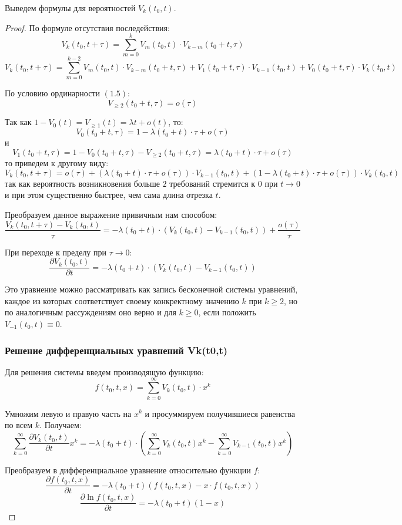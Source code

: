 \documentclass[aps,%
12pt,%
final,%
oneside,
onecolumn,%
musixtex, %
superscriptaddress,%
centertags]{article} %
\theoremstyle{plain}
\theoremstyle{definition}
\theoremstyle{remark}
\begin{document}
Выведем формулы для вероятностей $V_k(t_0,t)$.
\begin{proof}
По формуле отсутствия последействия:
$$V_k(t_0,t+\tau) = \sum_{m=0}^{k} V_m(t_0,t) \cdot V_{k-m} (t_0+t,\tau)$$
$$V_k(t_0,t+\tau) = \sum_{m=0}^{k-2} V_m(t_0,t) \cdot V_{k-m} (t_0+t,\tau) + V_1(t_0+t,\tau) \cdot V_{k-1}(t_0,t) + V_0(t_0+t,\tau) \cdot V_k(t_0,t)$$

По условию ординарности $(1.5)$:
$$V_{\geq 2}(t_0+t,\tau) = o(\tau)$$

Так как $1-V_0(t) = V_{\geq 1}(t) = \lambda t + o(t)$, то:
$$V_0(t_0+t,\tau) = 1 - \lambda(t_0+t) \cdot \tau + o(\tau)$$
и
$$V_1(t_0+t,\tau) = 1 - V_0(t_0+t,\tau) - V_{\geq 2}(t_0+t,\tau) = \lambda(t_0+t) \cdot \tau + o(\tau)$$
то приведем к другому виду:
$$V_k(t_0,t+\tau) = o(\tau) + ( \lambda(t_0+t) \cdot \tau + o(\tau)) \cdot V_{k-1}(t_0,t) + (1 - \lambda(t_0+t) \cdot \tau + o(\tau)) \cdot V_k(t_0,t)$$
так как вероятность возникновения больше $2$ требований стремится к $0$ при $t \to 0$ и при этом существенно быстрее, чем сама длина отрезка $t$.

Преобразуем данное выражение привичным нам способом:
$$\frac{V_k(t_0,t+\tau) - V_k(t_0,t)}{\tau} = -\lambda(t_0+t) \cdot \left(V_k(t_0,t) - V_{k-1}(t_0,t)\right) + \frac{o(\tau)}{\tau}$$

При переходе к пределу при $\tau \to 0$:
$$\frac{\partial V_k(t_0,t)}{\partial t} = -\lambda(t_0+t) \cdot \left(V_k(t_0,t) - V_{k-1}(t_0,t)\right)$$

Это уравнение можно рассматривать как запись бесконечной системы уравнений, каждое из которых соответствует своему конкректному значению $k$ при $k \geq 2$, но по аналогичным рассуждениям оно верно и для $k \geq 0$, если положить $V_{-1}(t_0,t) \equiv 0$.

\subsubsection{Решение дифференциальных уравнений Vk(t0,t)}

Для решения системы введем производящую функцию:
$$f(t_0,t,x) = \sum\limits_{k=0}^{\infty} V_k(t_0,t) \cdot x^k$$

Умножим левую и правую часть на $x^k$ и просуммируем получившиеся равенства по всем $k$. Получаем:
$$\sum\limits_{k=0}^{\infty} \frac{\partial V_k(t_0,t)}{\partial t} x^k= -\lambda(t_0+t) \cdot \left(\sum\limits_{k=0}^{\infty} V_k(t_0,t)x^k - \sum\limits_{k=0}^{\infty} V_{k-1}(t_0,t)x^k\right)$$

Преобразуем в дифференциальное уравнение относительно функции $f$:
$$\frac{\partial f(t_0,t,x)}{\partial t} = -\lambda(t_0+t)(f(t_0,t,x) - x \cdot f(t_0,t,x))$$
$$\frac{\partial \ln f(t_0,t,x)}{\partial t} = -\lambda(t_0+t)(1-x)$$


\end{proof}
\end{document}
